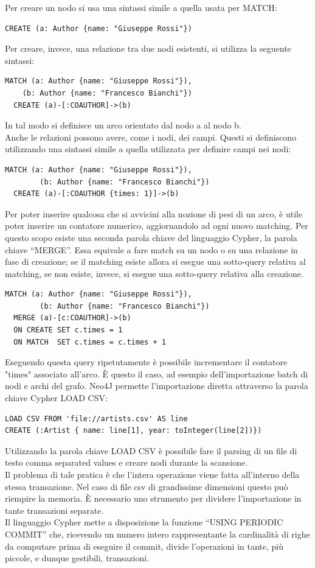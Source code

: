 \documentclass[a4paper, 12pt]{article}
\begin{document}
Per creare un nodo si usa una sintassi simile a quella usata per MATCH:
\begin{lstlisting}[keepspaces=true]
  CREATE (a: Author {name: "Giuseppe Rossi"})
\end{lstlisting}
Per creare, invece, una relazione tra due nodi esistenti, si utilizza la seguente sintassi:
\begin{lstlisting}[keepspaces=true]
  MATCH (a: Author {name: "Giuseppe Rossi"}),
    (b: Author {name: "Francesco Bianchi"})
  CREATE (a)-[:COAUTHOR]->(b)
\end{lstlisting}
In tal modo si definisce un arco orientato dal nodo a al nodo b. \\
Anche le relazioni possono avere, come i nodi, dei campi. Questi si definiscono utilizzando una sintassi simile a quella utilizzata per definire campi nei nodi:
\begin{lstlisting}[keepspaces=true]
  MATCH (a: Author {name: "Giuseppe Rossi"}),
        (b: Author {name: "Francesco Bianchi"})
  CREATE (a)-[:COAUTHOR {times: 1}]->(b)
\end{lstlisting}
Per poter inserire qualcosa che si avvicini alla nozione di pesi di un arco, è utile poter inserire un contatore numerico, aggiornandolo ad ogni nuovo matching.
Per questo scopo esiste una seconda parola chiave del linguaggio Cypher, la parola chiave ``MERGE''. Essa equivale a fare match su un nodo o su una relazione in fase di creazione; se il matching esiste allora si esegue una sotto-query relativa al matching, se non esiste, invece, si esegue una sotto-query relativa alla creazione.
\begin{lstlisting}[keepspaces=true]
  MATCH (a: Author {name: "Giuseppe Rossi"}),
        (b: Author {name: "Francesco Bianchi"})
  MERGE (a)-[c:COAUTHOR]->(b)
  ON CREATE SET c.times = 1
  ON MATCH  SET c.times = c.times + 1
\end{lstlisting}
Eseguendo questa query ripetutamente è possibile incrementare il contatore "times" associato all'arco. \`E questo il caso, ad esempio dell'importazione batch di nodi e archi del grafo.
Neo4J permette l'importazione diretta attraverso la parola chiave Cypher LOAD CSV:
\begin{lstlisting}
LOAD CSV FROM 'file://artists.csv' AS line
CREATE (:Artist { name: line[1], year: toInteger(line[2])})
\end{lstlisting}
Utilizzando la parola chiave LOAD CSV è possibile fare il parsing di un file di testo comma separated values e creare nodi durante la scansione. \\
Il problema di tale pratica è che l'intera operazione viene fatta all'interno della stessa transazione. Nel caso di file csv di grandissime dimensioni questo può riempire la memoria. \`E necessario uno strumento per dividere l'importazione in tante transazioni separate. \\
Il linguaggio Cypher mette a disposizione la funzione ``USING PERIODIC COMMIT'' che, ricevendo un numero intero rappresentante la cardinalità di righe da computare prima di eseguire il commit, divide l'operazioni in tante, più piccole, e dunque gestibili, transazioni.
\end{document}
